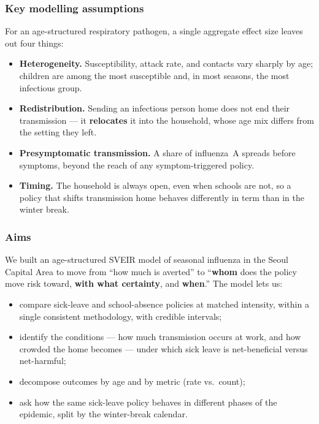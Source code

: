 \documentclass[dvipsnames, 10pt]{beamer}
\begin{document}
\begin{frame}\frametitle{Key modelling assumptions}
    For an age-structured respiratory pathogen, a single aggregate effect size
    leaves out four things:
    \begin{itemize}
        \item \textbf{Heterogeneity.} Susceptibility, attack rate, and contacts
              vary sharply by age; children are among the most susceptible and,
              in most seasons, the most infectious group.
        \item \textbf{Redistribution.} Sending an infectious person home does not
              end their transmission --- it \textbf{relocates} it into the
              household, whose age mix differs from the setting they left.
        \item \textbf{Presymptomatic transmission.} A share of influenza~A spreads
              before symptoms, beyond the reach of any symptom-triggered policy.
        \item \textbf{Timing.} The household is always open, even when schools are
              not, so a policy that shifts transmission home behaves differently
              in term than in the winter break.
    \end{itemize}
\end{frame}

\begin{frame}\frametitle{Aims}
    We built an age-structured SVEIR model of seasonal influenza in the Seoul
    Capital Area to move from ``how much is averted'' to ``\textbf{whom} does the
    policy move risk toward, \textbf{with what certainty}, and \textbf{when}.''
    The model lets us:
    \begin{itemize}
        \item[(i)] compare sick-leave and school-absence policies at matched
              intensity, within a single consistent methodology, with credible
              intervals;
        \item[(ii)] identify the conditions --- how much transmission occurs at
              work, and how crowded the home becomes --- under which sick leave is
              net-beneficial versus net-harmful;
        \item[(iii)] decompose outcomes by age and by metric (rate vs.\ count);
        \item[(iv)] ask how the same sick-leave policy behaves in different phases
              of the epidemic, split by the winter-break calendar.
    \end{itemize}
\end{frame}
\end{document}
